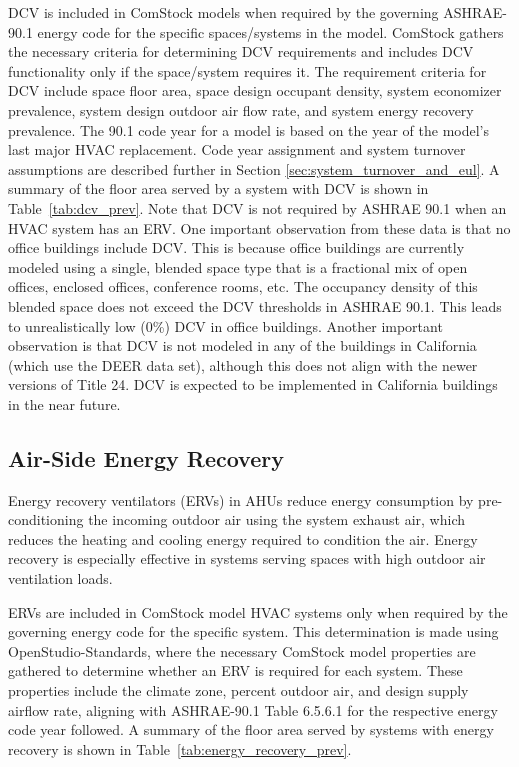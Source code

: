 DCV is included in ComStock models when required by the governing ASHRAE-90.1 energy code for the specific spaces/systems in the model. ComStock gathers the necessary criteria for determining DCV requirements and includes DCV functionality only if the space/system requires it. The requirement criteria for DCV include space floor area, space design occupant density, system economizer prevalence, system design outdoor air flow rate, and system energy recovery prevalence. The 90.1 code year for a model is based on the year of the model's last major HVAC replacement. Code year assignment and system turnover assumptions are described further in Section \ref{sec:system_turnover_and_eul}. A summary of the floor area served by a system with DCV is shown in Table~\ref{tab:dcv_prev}. Note that DCV is not required by ASHRAE 90.1 when an HVAC system has an ERV. One important observation from these data is that no office buildings include DCV. This is because office buildings are currently modeled using a single, blended space type that is a fractional mix of open offices, enclosed offices, conference rooms, etc. The occupancy density of this blended space does not exceed the DCV thresholds in ASHRAE 90.1. This leads to unrealistically low (0\%) DCV in office buildings. Another important observation is that DCV is not modeled in any of the buildings in California (which use the DEER data set), although this does not align with the newer versions of Title 24. DCV is expected to be implemented in California buildings in the near future.


\subsection{Air-Side Energy Recovery}
\label{sec:erv}

Energy recovery ventilators (ERVs) in AHUs reduce energy consumption by pre-conditioning the incoming outdoor air using the system exhaust air, which reduces the heating and cooling energy required to condition the air. Energy recovery is especially effective in systems serving spaces with high outdoor air ventilation loads.

ERVs are included in ComStock model HVAC systems only when required by the governing energy code for the specific system. This determination is made using OpenStudio-Standards, where the necessary ComStock model properties are gathered to determine whether an ERV is required for each system. These properties include the climate zone, percent outdoor air, and design supply airflow rate, aligning with ASHRAE-90.1 Table 6.5.6.1 for the respective energy code year followed. A summary of the floor area served by systems with energy recovery is shown in Table~\ref{tab:energy_recovery_prev}.

